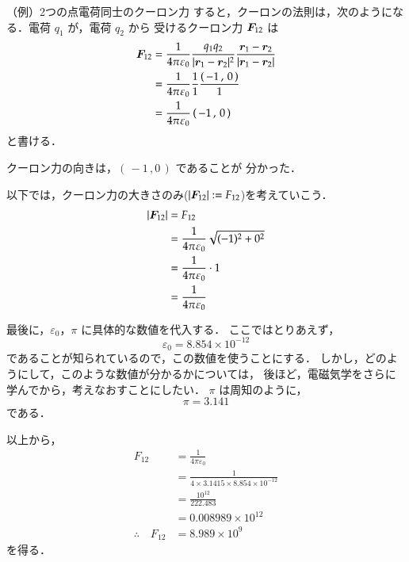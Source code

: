\begin{memo}{（例）2つの点電荷同士のクーロン力}
    すると，クーロンの法則は，次のようになる．電荷 $q_{1}$ が，電荷 $q_{2}$ から
    受けるクーロン力 $\boldsymbol{F}_{12}$ は
            \begin{align*}
                \boldsymbol{F}_{12}
                &= \frac{1}{4\pi\varepsilon_{0}}
                \frac{q_{1}q_{2}}{|\boldsymbol{r}_{1}-\boldsymbol{r}_{2}|^{2}}
                \frac{\boldsymbol{r}_{1}-\boldsymbol{r}_{2}}
                     {|\boldsymbol{r}_{1}-\boldsymbol{r}_{2}|} \\
                &= \frac{1}{4\pi\varepsilon_{0}}
                \frac{1}{ 1 }
                \frac{\left( \,-1\,,\,0\, \right)}
                     { 1 } \\
                &= \frac{1}{4\pi\varepsilon_{0}} \left( \,-1\,,\,0\, \right)
            \end{align*}
    と書ける．

    クーロン力の向きは，$\left( \,-1\,,0\,\right)$ であることが
    分かった．

    以下では，クーロン力の大きさのみ($| \boldsymbol{F}_{12} | := F_{12}$)を考えていこう．
        \begin{align*}
            |\boldsymbol{F}_{12}|  &= F_{12} \\
                        &= \frac{1}{4\pi\varepsilon_{0}} \sqrt{(-1)^{2}+0^{2}} \\
                        &= \frac{1}{4\pi\varepsilon_{0}} \cdot 1               \\
                        &= \frac{1}{4\pi\varepsilon_{0}}
        \end{align*}

    最後に，$\varepsilon_{0}$，$\pi$ に具体的な数値を代入する．
    ここではとりあえず，
        \begin{equation*}
            \varepsilon_{0} = 8.854 \times 10^{-12}
        \end{equation*}
    であることが知られているので，この数値を使うことにする．
    しかし，どのようにして，このような数値が分かるかについては，
    後ほど，電磁気学をさらに学んでから，考えなおすことにしたい．
    $\pi$ は周知のように，
        \begin{equation*}
            \pi = 3.141
        \end{equation*}
    である．

    以上から，
            \begin{align*}
                F_{12}
                &= \frac{1}{4\pi\varepsilon_{0}} \\
                &= \frac{1}{4 \times 3.1415 \times 8.854 \times 10^{-12}} \\
                &= \frac{10^{12}}{ 222.483 }  \\
                &= 0.008989 \times 10^{12}  \\
                \therefore\quad
                F_{12}
                &= 8.989 \times 10^{9}
            \end{align*}
    を得る．


\end{memo}
